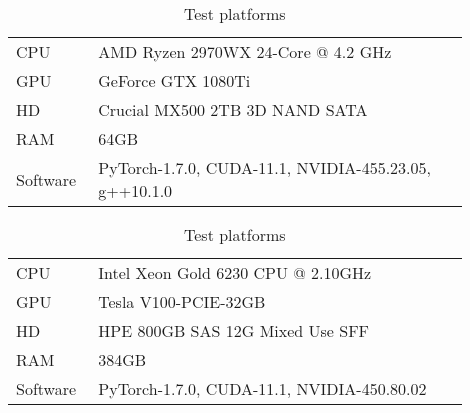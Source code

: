 \begin{table}
  \caption{Test platforms}
  \centering
  \begin{tabular}[t]{p{0.15\linewidth}p{0.75\linewidth}}
    \hline
    CPU      & AMD Ryzen 2970WX 24-Core @ 4.2 GHz       \\
    GPU      & GeForce GTX 1080Ti                                              \\
    HD       & Crucial MX500 2TB 3D NAND SATA                                  \\
    RAM      & 64GB                                                            \\
    Software & PyTorch-1.7.0, CUDA-11.1, NVIDIA-455.23.05, g++10.1.0           \\
    \hline
  \end{tabular}
  \bigskip
  \begin{tabular}[t]{p{0.15\linewidth}p{0.75\linewidth}}
    \hline
    CPU      & Intel Xeon Gold 6230 CPU @ 2.10GHz                              \\
    GPU      & Tesla V100-PCIE-32GB                                            \\
    HD       & HPE 800GB SAS 12G Mixed Use SFF                                 \\
    RAM      & 384GB                                                           \\
    Software & PyTorch-1.7.0, CUDA-11.1, NVIDIA-450.80.02                      \\
    \hline
  \end{tabular}
  \label{tab:platforms}
\end{table}